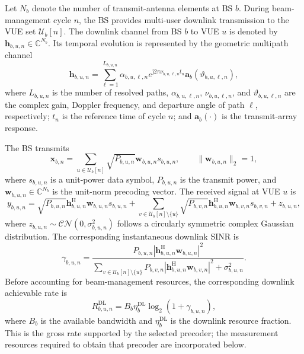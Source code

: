 Let \(N_b\) denote the number of transmit-antenna elements at BS \(b\).  During
beam-management cycle \(n\), the BS provides multi-user downlink transmission
to the VUE set \(\mathcal{U}_b[n]\).  The downlink channel from BS \(b\) to VUE
\(u\) is denoted by
\(\mathbf{h}_{b,u,n}\in\mathbb{C}^{N_b}\).  Its temporal evolution is
represented by the geometric multipath channel
\begin{equation}
    \mathbf{h}_{b,u,n}
    =
    \sum_{\ell=1}^{L_{b,u,n}}
    \alpha_{b,u,\ell,n}
    e^{\mathrm{j}2\pi\nu_{b,u,\ell,n}t_n}
    \mathbf{a}_b(\vartheta_{b,u,\ell,n}),
    \label{eq:system-geometric-channel}
\end{equation}
where \(L_{b,u,n}\) is the number of resolved paths,
\(\alpha_{b,u,\ell,n}\), \(\nu_{b,u,\ell,n}\), and
\(\vartheta_{b,u,\ell,n}\) are the complex gain, Doppler frequency, and
departure angle of path \(\ell\), respectively; \(t_n\) is the reference time
of cycle \(n\); and \(\mathbf{a}_b(\cdot)\) is the transmit-array response.

The BS transmits
\begin{equation}
    \mathbf{x}_{b,n}
    =\sum_{u\in\mathcal{U}_b[n]}
    \sqrt{P_{b,u,n}}\mathbf{w}_{b,u,n}s_{b,u,n},
    \qquad \|\mathbf{w}_{b,u,n}\|_2=1,
    \label{eq:system-downlink-transmit}
\end{equation}
where \(s_{b,u,n}\) is a unit-power data symbol, \(P_{b,u,n}\) is the
transmit power, and \(\mathbf{w}_{b,u,n}\in\mathbb{C}^{N_b}\) is the
unit-norm precoding vector.  The received signal at VUE \(u\) is
\begin{equation}
    y_{b,u,n}
    =
    \sqrt{P_{b,u,n}}\mathbf{h}^{\mathrm{H}}_{b,u,n}
    \mathbf{w}_{b,u,n}s_{b,u,n}
    +
    \sum_{v\in\mathcal{U}_b[n]\setminus\{u\}}
    \sqrt{P_{b,v,n}}\mathbf{h}^{\mathrm{H}}_{b,u,n}
    \mathbf{w}_{b,v,n}s_{b,v,n}
    +z_{b,u,n},
    \label{eq:system-downlink-signal}
\end{equation}
where \(z_{b,u,n}\sim\mathcal{CN}(0,\sigma^2_{b,u,n})\) follows a circularly
symmetric complex Gaussian distribution.  The corresponding instantaneous
downlink SINR is
\begin{equation}
    \gamma_{b,u,n}
    =
    \frac{P_{b,u,n}
    \left|\mathbf{h}^{\mathrm{H}}_{b,u,n}\mathbf{w}_{b,u,n}\right|^2}
    {\displaystyle
    \sum_{v\in\mathcal{U}_b[n]\setminus\{u\}}
    P_{b,v,n}
    \left|\mathbf{h}^{\mathrm{H}}_{b,u,n}\mathbf{w}_{b,v,n}\right|^2
    +\sigma^2_{b,u,n}}.
    \label{eq:system-downlink-sinr}
\end{equation}
Before accounting for beam-management resources, the corresponding downlink
achievable rate is
\begin{equation}
    R^{\mathrm{DL}}_{b,u,n}
    =B_b\eta_b^{\mathrm{DL}}
    \log_2\!\left(1+\gamma_{b,u,n}\right),
    \label{eq:system-downlink-rate}
\end{equation}
where \(B_b\) is the available bandwidth and \(\eta_b^{\mathrm{DL}}\) is the
downlink resource fraction.  This is the gross rate supported by the selected
precoder; the measurement resources required to obtain that precoder are
incorporated below.

